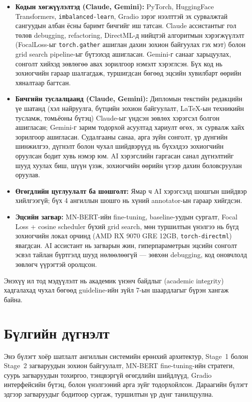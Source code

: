\begin{itemize}
  \item \textbf{Кодын хөгжүүлэлтэд (Claude, Gemini):} PyTorch, HuggingFace
    Transformers, \texttt{imbalanced-learn}, Gradio зэрэг нээлттэй эх
    сурвалжтай сангуудын албан ёсны баримт бичгийг иш татсан. Claude
    ассистантыг гол төлөв debugging, refactoring, DirectML-д нийцтэй
    алгоритмын хэрэгжүүлэлт (FocalLoss-ыг \texttt{torch.gather} ашиглан
    дахин зохион байгуулах гэх мэт) болон grid search pipeline-ыг
    бүтээхэд ашигласан. Gemini-г санааг харьцуулах, сонголт хийхэд
    зөвлөгөө авах зорилгоор нэмэлт хэрэглсэн. Бүх код нь зохиогчийн
    гараар шалгагдаж, туршигдсан бөгөөд эцсийн хувилбарт өөрийн
    хяналтаар багтсан.
  \item \textbf{Бичгийн туслалцаанд (Claude, Gemini):} Дипломын текстийн
    редакцийн үе шатанд (хэл найруулга, бүтцийн зохион байгуулалт,
    LaTeX-ын техникийн тусламж, томьёоны бүтэц) Claude-ыг үндсэн
    зөвлөх хэрэгсэл болгон ашигласан; Gemini-г зарим тодорхой асуултад
    хариулт өгөх, эх сурвалж хайх зорилгоор ашигласан. Судалгааны
    санаа, арга зүйн сонголт, үр дүнгийн шинжилгээ, дүгнэлт болон
    чухал шийдвэрүүд нь бүхэлдээ зохиогчийн оруулсан бодит хувь нэмэр
    юм. AI хэрэгслийн гаргасан санал дүгнэлтийг шууд хуулах биш, шүүн
    үзэж, зохиогчийн өөрийн үгээр дахин боловсруулан оруулав.
  \item \textbf{Өгөгдлийн цуглуулалт ба шошголт:} Ямар ч AI хэрэгсэлд
    шошгын шийдвэр хийлгээгүй; бүх 4 ангиллын шошго нь хүний
    annotator-ын гараар хийгдсэн.
  \item \textbf{Эцсийн загвар:} MN-BERT-ийн fine-tuning, baseline-уудын
    сургалт, Focal Loss + cosine scheduler бүхий grid search, мөн
    туршилтын үнэлгээ нь бүгд зохиогчийн локал орчинд (AMD RX 9070 GRE
    12GB, \texttt{torch-directml}) явагдсан. AI ассистант нь загварын
    жин, гиперпараметрын эцсийн сонголт эсвэл тайлан бүртгэлд шууд
    нөлөөлөөгүй --- зөвхөн debugging, код оновчлолд зөвлөгч үүрэгтэй
    оролцсон.
\end{itemize}

Энэхүү ил тод мэдүүлэлт нь академик үнэнч байдлыг (academic integrity)
хадгалахад чухал бөгөөд guideline-ийн зүйл 7-ын шаардлагыг бүрэн хангаж байна.

\section{Бүлгийн дүгнэлт}

Энэ бүлэгт хоёр шатлалт ангиллын системийн ерөнхий архитектур, Stage~1 болон
Stage~2 загваруудын зохион байгуулалт, MN-BERT fine-tuning-ийн стратеги,
суурь загваруудын тохиргоо, тэнцвэргүй өгөгдлийн шийдлүүд, Gradio
интерфейсийн бүтэц, болон үнэлгээний арга зүйг тодорхойлсон. Дараагийн
бүлэгт эдгээр загваруудыг бодитоор сургаж, туршилтын үр дүнг танилцуулна.
